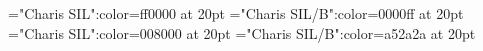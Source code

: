 \documentclass[a4paper]{article}
\begin{document}
\pagestyle{plain}
\sloppy
\setlength{\parfillskip}{0pt plus 1fil}
\font\ta="Charis SIL":color=ff0000 at 20pt
\font\tbta="Charis SIL/B":color=0000ff at 20pt
\font\tctbta="Charis SIL":color=008000 at 20pt
\font\tdtbta="Charis SIL/B":color=a52a2a at 20pt

\pagestyle{fancy} 






\end{document}

